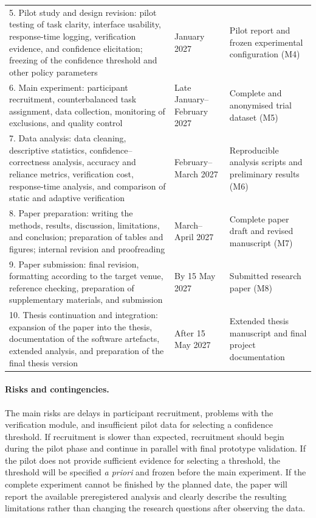 \documentclass[oneside,final,14pt,a4paper]{extreport}
\theoremstyle{definition}
\theoremstyle{remark}
\begin{document}
\begin{longtable}{p{8.0cm}p{2.4cm}p{5.3cm}}
5. Pilot study and design revision:
pilot testing of task clarity, interface usability, response-time
logging, verification evidence, and confidence elicitation;
freezing of the confidence threshold and other policy parameters &
January 2027 &
Pilot report and frozen experimental configuration (M4) \\

6. Main experiment:
participant recruitment, counterbalanced task assignment,
data collection, monitoring of exclusions, and quality control &
Late January--February 2027 &
Complete and anonymised trial dataset (M5) \\

7. Data analysis:
data cleaning, descriptive statistics, confidence--correctness
analysis, accuracy and reliance metrics, verification cost,
response-time analysis, and comparison of static and adaptive
verification &
February--March 2027 &
Reproducible analysis scripts and preliminary results (M6) \\

8. Paper preparation:
writing the methods, results, discussion, limitations, and conclusion;
preparation of tables and figures; internal revision and proofreading &
March--April 2027 &
Complete paper draft and revised manuscript (M7) \\

9. Paper submission:
final revision, formatting according to the target venue,
reference checking, preparation of supplementary materials,
and submission &
By 15 May 2027 &
Submitted research paper (M8) \\

10. Thesis continuation and integration:
expansion of the paper into the thesis, documentation of the software
artefacts, extended analysis, and preparation of the final thesis version &
After 15 May 2027 &
Extended thesis manuscript and final project documentation \\

\end{longtable}

\paragraph{Risks and contingencies.}
The main risks are delays in participant recruitment, problems with the
verification module, and insufficient pilot data for selecting a confidence
threshold. If recruitment is slower than expected, recruitment should begin
during the pilot phase and continue in parallel with final prototype
validation. If the pilot does not provide sufficient evidence for selecting a
threshold, the threshold will be specified \emph{a priori} and frozen before
the main experiment. If the complete experiment cannot be finished by the
planned date, the paper will report the available preregistered analysis and
clearly describe the resulting limitations rather than changing the research
questions after observing the data.
\end{document}
